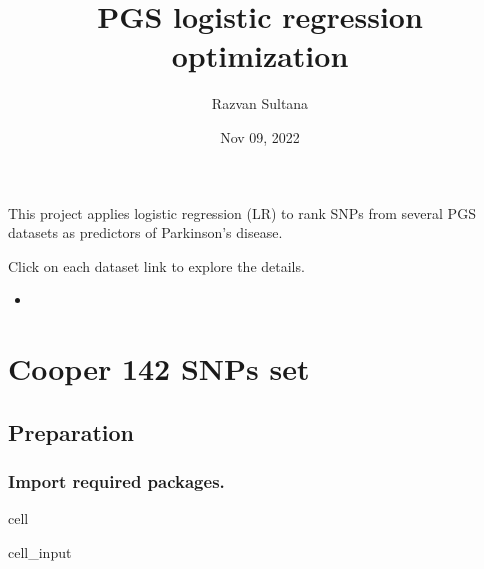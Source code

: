 \documentclass[letterpaper,10pt,english]{jupyterBook}
\title{PGS logistic regression optimization}
\date{Nov 09, 2022}
\author{Razvan Sultana}
\begin{document}
\pagestyle{empty}
\sphinxmaketitle
\pagestyle{plain}
\sphinxtableofcontents
\pagestyle{normal}
\label{\detokenize{intro::doc}}


\sphinxAtStartPar
This project applies logistic regression (LR) to rank SNPs from several PGS datasets as predictors of Parkinson’s disease.

\sphinxAtStartPar
Click on each dataset link to explore the details.
\begin{itemize}
\item {} 
\sphinxAtStartPar
{\hyperref[\detokenize{Cooper::doc}]{}}

\end{itemize}

\sphinxstepscope


\chapter{Cooper 142 SNPs set}
\label{\detokenize{Cooper:cooper-142-snps-set}}\label{\detokenize{Cooper::doc}}

\section{Preparation}
\label{\detokenize{Cooper:preparation}}

\subsection{Import required packages.}
\label{\detokenize{Cooper:import-required-packages}}
\begin{sphinxuseclass}{cell}\begin{sphinxVerbatimInput}

\begin{sphinxuseclass}{cell_input}
\begin{sphinxVerbatim}[commandchars=\\\{\}]
   
   
   
   
   
   
   
\end{sphinxVerbatim}

\end{sphinxuseclass}\end{sphinxVerbatimInput}

\end{sphinxuseclass}
\end{document}
